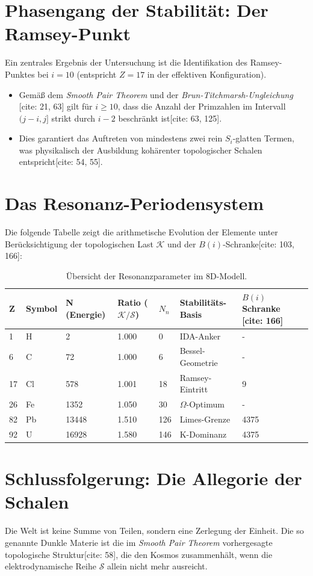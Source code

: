 \documentclass[11pt,a4paper]{article}
\begin{document}
	\section{Phasengang der Stabilität: Der Ramsey-Punkt}
	Ein zentrales Ergebnis der Untersuchung ist die Identifikation des Ramsey-Punktes bei $i=10$ (entspricht $Z=17$ in der effektiven Konfiguration). 
	\begin{itemize}
		\item Gemäß dem \textit{Smooth Pair Theorem}  und der \textit{Brun-Titchmarsh-Ungleichung} [cite: 21, 63] gilt für $i \ge 10$, dass die Anzahl der Primzahlen im Intervall $(j-i, j]$ strikt durch $i-2$ beschränkt ist[cite: 63, 125].
		\item Dies garantiert das Auftreten von mindestens zwei rein $S_i$-glatten Termen, was physikalisch der Ausbildung kohärenter topologischer Schalen entspricht[cite: 54, 55].
	\end{itemize}
	
	
	
	\section{Das Resonanz-Periodensystem}
	Die folgende Tabelle zeigt die arithmetische Evolution der Elemente unter Berücksichtigung der topologischen Last $\mathcal{K}$ und der $B(i)$-Schranke[cite: 103, 166]:
	
	\begin{table}[h]
		\centering
		\begin{tabular}{@{}lllllll@{}}
			\toprule
			Z & Symbol & N (Energie) & Ratio ($\mathcal{K}/\mathcal{S}$) & $N_n$ & Stabilitäts-Basis & $B(i)$ Schranke [cite: 166] \\ \midrule
			1 & H & 2 & 1.000 & 0 & IDA-Anker & - \\
			6 & C & 72 & 1.000 & 6 & Bessel-Geometrie & - \\
			17 & Cl & 578 & 1.001 & 18 & Ramsey-Eintritt & 9 \\
			26 & Fe & 1352 & 1.050 & 30 & $\Omega$-Optimum & - \\
			82 & Pb & 13448 & 1.510 & 126 & Limes-Grenze & 4375 \\
			92 & U & 16928 & 1.580 & 146 & K-Dominanz & 4375 \\ \bottomrule
		\end{tabular}
		\caption{Übersicht der Resonanzparameter im 8D-Modell.}
	\end{table}
	
	\section{Schlussfolgerung: Die Allegorie der Schalen}
	Die Welt ist keine Summe von Teilen, sondern eine Zerlegung der Einheit. Die so genannte Dunkle Materie ist die im \textit{Smooth Pair Theorem} vorhergesagte topologische Struktur[cite: 58], die den Kosmos zusammenhält, wenn die elektrodynamische Reihe $\mathcal{S}$ allein nicht mehr ausreicht. 
	
\end{document}
